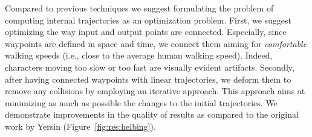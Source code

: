 Compared to previous techniques we suggest formulating the problem of computing internal trajectories as an optimization problem.
First, we suggest optimizing the way input and output points are connected.
Especially, since waypoints are defined in space and time, we connect them aiming for {\it comfortable} walking speeds (i.e., close to the average human walking speed).
Indeed, characters moving too slow or too fast are visually evident artifacts.
Secondly, after having connected waypoints with linear trajectories, we deform them to remove any collisions by employing an iterative approach.
This approach aims at minimizing as much as possible the changes to the initial trajectories.
We demonstrate improvements in the quality of results as compared to the original work by Yersin \etal (Figure~\ref{fig:res:helbing}).


